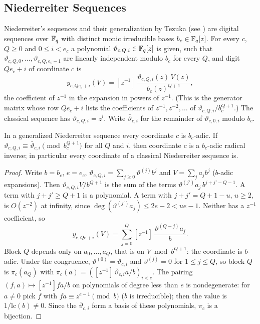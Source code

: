 \subsection{Niederreiter Sequences}
Niederreiter's sequences \cite{Nie87} and their generalization by Tezuka \cite{Tez93} (see \cite[Ch.~8]{DP10}) are digital sequences over $\mathbb{F}_q$ with distinct monic irreducible bases $b_c\in\mathbb{F}_q[z]$. For every $c$, $Q\ge0$ and $0\le i<e_c$ a polynomial $\vartheta_{c,Q,i}\in\mathbb{F}_q[z]$ is given, such that $\vartheta_{c,Q,0},\dots,\vartheta_{c,Q,e_c-1}$ are linearly independent modulo $b_c$ for every $Q$, and digit $Qe_c+i$ of coordinate $c$ is
\[
y_{c,Qe_c+i}(V)=[z^{-1}]\,\frac{\vartheta_{c,Q,i}(z)\,V(z)}{b_c(z)^{Q+1}},
\]
the coefficient of $z^{-1}$ in the expansion in powers of $z^{-1}$. (This is the generator matrix whose row $Qe_c+i$ lists the coefficients of $z^{-1},z^{-2},\dots$ of $\vartheta_{c,Q,i}/b_c^{Q+1}$.) The classical sequence has $\vartheta_{c,Q,i}=z^i$. Write $\bar\vartheta_{c,i}$ for the remainder of $\vartheta_{c,0,i}$ modulo $b_c$.

\begin{lemma}\label{lem:nied}
In a generalized Niederreiter sequence every coordinate $c$ is $b_c$-adic. If $\vartheta_{c,Q,i}\equiv\bar\vartheta_{c,i}\pmod{b_c^{Q+1}}$ for all $Q$ and $i$, then coordinate $c$ is a $b_c$-adic radical inverse; in particular every coordinate of a classical Niederreiter sequence is.
\end{lemma}

\begin{proof}
Write $b=b_c$, $e=e_c$, $\vartheta_{c,Q,i}=\sum_{j\ge0}\vartheta^{(j)}b^j$ and $V=\sum_ja_jb^j$ ($b$-adic expansions). Then $\vartheta_{c,Q,i}V/b^{Q+1}$ is the sum of the terms $\vartheta^{(j')}a_j\,b^{j+j'-Q-1}$. A term with $j+j'\ge Q+1$ is a polynomial. A term with $j+j'=Q+1-u$, $u\ge2$, is $O(z^{-2})$ at infinity, since $\deg(\vartheta^{(j')}a_j)\le2e-2<ue-1$. Neither has a $z^{-1}$ coefficient, so
\[
y_{c,Qe+i}(V)=\sum_{j=0}^{Q}[z^{-1}]\,\frac{\vartheta^{(Q-j)}a_j}{b}.
\]
Block $Q$ depends only on $a_0,\dots,a_Q$, that is on $V\bmod b^{Q+1}$: the coordinate is $b$-adic. Under the congruence, $\vartheta^{(0)}=\bar\vartheta_{c,i}$ and $\vartheta^{(j)}=0$ for $1\le j\le Q$, so block $Q$ is $\pi_c(a_Q)$ with $\pi_c(a)=([z^{-1}]\,\bar\vartheta_{c,i}a/b)_{i<e}$. The pairing $(f,a)\mapsto[z^{-1}]fa/b$ on polynomials of degree less than $e$ is nondegenerate: for $a\ne0$ pick $f$ with $fa\equiv z^{e-1}\pmod b$ ($b$ is irreducible); then the value is $1/\mathrm{lc}(b)\ne0$. Since the $\bar\vartheta_{c,i}$ form a basis of these polynomials, $\pi_c$ is a bijection.
\end{proof}

